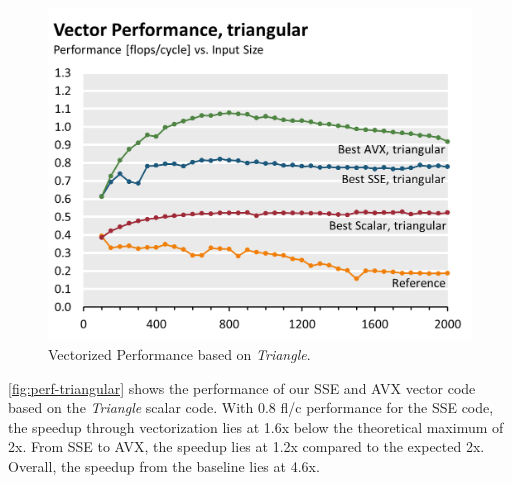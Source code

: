 \begin{figure}[htb]\centering
  \includegraphics[width=\linewidth]{plot_data/triangular_vector_performance.png}
  \caption{Vectorized Performance based on \emph{Triangle}.}
  \label{fig:perf-triangular}
\end{figure}
\autoref{fig:perf-triangular} shows the performance of our SSE and AVX
vector code based on the \emph{Triangle} scalar code. With 0.8 fl/c
performance for the SSE code, the speedup through vectorization lies at
1.6x below the theoretical maximum of 2x. From SSE to AVX, the speedup lies
at 1.2x compared to the expected 2x. Overall, the speedup from the baseline
lies at 4.6x.

